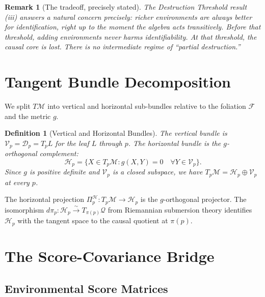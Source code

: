 \documentclass[11pt,a4paper]{article}
\newtheorem{definition}[theorem]{Definition}
\newtheorem{remark}{Remark}
\newcommand{\cM}{\mathcal{M}}
\newcommand{\cF}{\mathcal{F}}
\newcommand{\cH}{\mathcal{H}}
\newcommand{\cV}{\mathcal{V}}
\newcommand{\cD}{\mathcal{D}}
\newcommand{\cQ}{\mathcal{Q}}
\begin{document}
\begin{remark}[The tradeoff, precisely stated]
The Destruction Threshold result (iii) answers a natural concern precisely: richer environments are always better for identification, right up to the moment the algebra acts transitively. Before that threshold, adding environments never harms identifiability. At that threshold, the causal core is lost. There is no intermediate regime of ``partial destruction.''
\end{remark}

\section{Tangent Bundle Decomposition}
\label{sec:decomp}

We split $T\cM$ into vertical and horizontal sub-bundles relative to the foliation $\cF$ and the metric $g$.

\begin{definition}[Vertical and Horizontal Bundles]
The \emph{vertical bundle} is $\cV_p = \cD_p = T_p L$ for the leaf $L$ through $p$.
The \emph{horizontal bundle} is the $g$-orthogonal complement:
\[
\cH_p = \{X \in T_p\cM : g(X, Y) = 0 \quad \forall Y \in \cV_p\}.
\]
Since $g$ is positive definite and $\cV_p$ is a closed subspace, we have $T_p\cM = \cH_p \oplus \cV_p$ at every $p$.
\end{definition}

The horizontal projection $\Pi^\cH_p : T_p\cM \to \cH_p$ is the $g$-orthogonal projector. The isomorphism $d\pi_p: \cH_p \xrightarrow{\sim} T_{\pi(p)}\cQ$ from Riemannian submersion theory identifies $\cH_p$ with the tangent space to the causal quotient at $\pi(p)$.

\section{The Score-Covariance Bridge}
\label{sec:bridge}

\subsection{Environmental Score Matrices}
\end{document}
